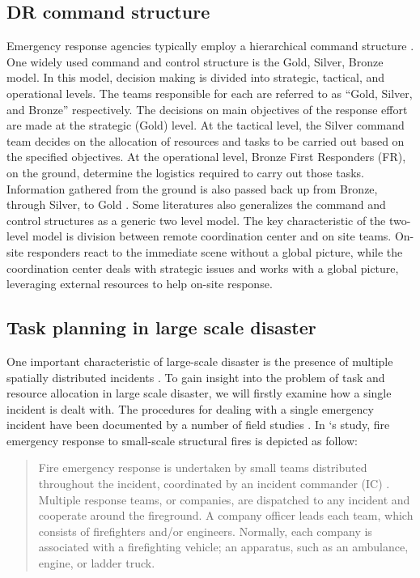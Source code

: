 \subsection{DR command structure}\label{sec:lrstructure}
Emergency response agencies typically employ a hierarchical command structure \citep{Ramchurn2015}. One widely used command and control structure is the Gold, Silver, Bronze model. In this model, decision making is divided into strategic, tactical, and operational levels. The teams responsible for each are referred to as ``Gold, Silver, and Bronze'' respectively. The decisions on main objectives of the response effort are made at the strategic (Gold) level. At the tactical level, the Silver command team decides on the allocation of resources and tasks to be carried out  based on the specified objectives. At the operational level, Bronze First Responders (FR), on the ground, determine the logistics required to carry out those tasks. Information gathered from the ground is also passed back up from Bronze, through Silver, to Gold \citep{Ramchurn2015}. Some literatures \citep{Chen2005,Chen2008} also generalizes the command and control structures as a generic two level model. The key characteristic of the two-level model is division between remote coordination center and on site teams.  On-site responders react to the immediate scene without a global picture, while the coordination center deals with strategic issues and works with a global picture, leveraging external resources to help on-site response. \\


\subsection{Task planning in large scale disaster} \label{sec:LRtaskplanning}
One important characteristic of large-scale disaster is the presence of multiple spatially distributed incidents \citep{Chen2005}. To gain insight into the problem of task and resource allocation in large scale disaster, we will firstly examine how a single incident is dealt with. The procedures for dealing with a single emergency incident have been documented by a number of field studies \citep{Comfort2004,Dawes2004,Petrescu-prahova2005}. In \cite{Toups2011}`s study, fire emergency response to small-scale structural fires is depicted as follow: 

\begin{quote}
Fire emergency response is undertaken by small teams distributed throughout the incident, coordinated by an incident commander (IC) . Multiple response teams, or companies, are dispatched to any incident and cooperate around the fireground. A company officer leads each team, which consists of firefighters and/or engineers. Normally, each company is associated with a firefighting vehicle; an apparatus, such as an ambulance, engine, or ladder truck.\\
\end{quote}

